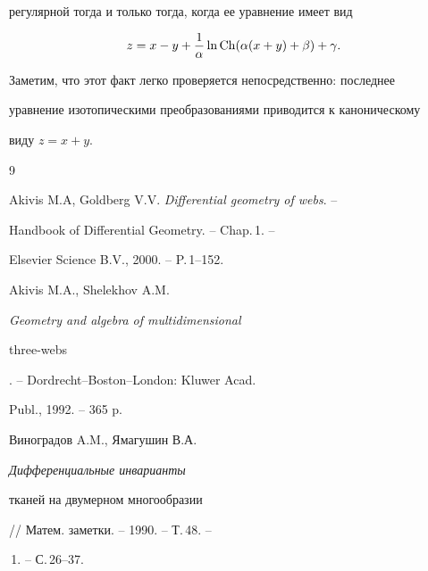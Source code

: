 регулярной тогда и только тогда, когда ее уравнение имеет вид 


$$ 


z=x-y+\frac{1}{\alpha}\ln\Ch(\alpha(x+y)+\beta)+\gamma. 


$$ 


Заметим, что этот факт легко проверяется непосредственно: последнее 


уравнение изотопическими преобразованиями приводится к каноническому


виду $z=x+y$. 


 


 


\begin{thebibliography}{9} 


 




Akivis M.A, Goldberg V.V. {\em Differential geometry of webs}. -- 


Handbook of Differential Geometry. -- Chap.\,1. -- 


Elsevier Science B.V., 2000. -- P.\,1--152. 




Akivis M.A., Shelekhov A.M. {\em Geometry and algebra of multidimensional 


three-webs}. -- Dordrecht--Boston--London: Kluwer Acad. 


Publ., 1992. -- 365 p. 




Виноградов A.M., Ямагушин В.А. {\em Дифференциальные инварианты 


тканей на двумерном многообразии} // Матем. заметки. -- 1990. -- Т.\,48. -- 


\No\,1. -- С.\,26--37. 


 


\end{thebibliography} 


 


\vskip 2cm 


 






 


\label{end} 


 


